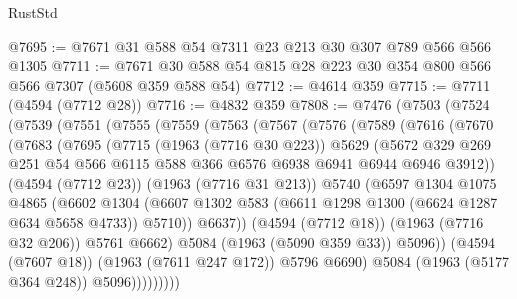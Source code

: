 \begin{lexlean}{RustStd}
\begin{coremodule}
@7695 := @7671 @31 @588 @54 @7311 @23 @213 @30 @307 @789 @566 @566 @1305
@7711 := @7671 @30 @588 @54 @815 @28 @223 @30 @354 @800 @566 @566 @7307 (@5608 @359 @588 @54)
@7712 := @4614 @359
@7715 := @7711 (@4594 (@7712 @28))
@7716 := @4832 @359
@7808 := @7476
    (@7503
      (@7524
        (@7539
          (@7551
            (@7555
              (@7559
                (@7563
                  (@7567
                    (@7576
                      (@7589
                        (@7616
                          (@7670
                            (@7683
                              (@7695
                                (@7715
                                  (@1963 (@7716 @30 @223))
                                  @5629
                                  (@5672
                                    @329
                                    @269
                                    @251
                                    @54
                                    @566
                                    @6115
                                    @588
                                    @366
                                    @6576
                                    @6938
                                    @6941
                                    @6944
                                    @6946
                                    @3912))
                                (@4594 (@7712 @23))
                                (@1963 (@7716 @31 @213))
                                @5740
                                (@6597
                                  @1304
                                  @1075
                                  @4865
                                  (@6602
                                    @1304
                                    (@6607
                                      @1302
                                      @583
                                      (@6611 @1298 @1300 (@6624 @1287 @634 @5658 @4733))
                                      @5710))
                                  @6637))
                              (@4594 (@7712 @18))
                              (@1963 (@7716 @32 @206))
                              @5761
                              @6662)
                            @5084
                            (@1963 (@5090 @359 @33))
                            @5096))
                        (@4594 (@7607 @18))
                        (@1963 (@7611 @247 @172))
                        @5796
                        @6690)
                      @5084
                      (@1963 (@5177 @364 @248))
                      @5096)))))))))

\end{coremodule}
\end{lexlean}
